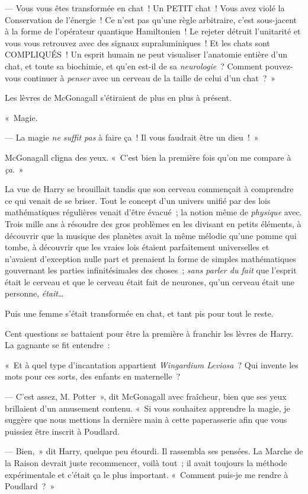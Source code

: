 --- Vous vous êtes transformée en chat~! Un PETIT chat~! Vous avez violé la Conservation de l'énergie~! Ce n'est pas qu'une règle arbitraire, c'est sous-jacent à la forme de l'opérateur quantique Hamiltonien~! Le rejeter détruit l'unitarité et vous vous retrouvez avec des signaux supraluminiques~! Et les chats sont COMPLIQUÉS~! Un esprit humain ne peut visualiser l'anatomie entière d'un chat, et toute sa biochimie, et qu'en est-il de sa \emph{neurologie}~? Comment pouvez-vous continuer à \emph{penser} avec un cerveau de la taille de celui d'un chat~?~»

Les lèvres de McGonagall s'étiraient de plus en plus à présent.

«~Magie.

--- La magie \emph{ne suffit pas} à faire ça~! Il vous faudrait être un dieu~!~»

McGonagall cligna des yeux. «~C'est bien la première fois qu'on me compare à \emph{ça}.~»

La vue de Harry se brouillait tandis que son cerveau commençait à comprendre ce qui venait de se briser. Tout le concept d'un univers unifié par des lois mathématiques régulières venait d'être évacué~; la notion même de \emph{physique} avec. Trois mille ans à résoudre des gros problèmes en les divisant en petits éléments, à découvrir que la musique des planètes avait la même mélodie qu'une pomme qui tombe, à découvrir que les vraies lois étaient parfaitement universelles et n'avaient d'exception nulle part et prenaient la forme de simples mathématiques gouvernant les parties infinitésimales des choses~; \emph{sans parler du fait} que l'esprit était le cerveau et que le cerveau était fait de neurones, qu'un cerveau était une personne, \emph{était}…

Puis une femme s'était transformée en chat, et tant pis pour tout le reste.

Cent questions se battaient pour être la première à franchir les lèvres de Harry. La gagnante se fit entendre~:

«~Et à quel type d'incantation appartient \emph{Wingardium Leviosa}~? Qui invente les mots pour ces sorts, des enfants en maternelle~?

--- C'est assez, M. Potter~», dit McGonagall avec fraîcheur, bien que ses yeux brillaient d'un amusement contenu. «~Si vous souhaitez apprendre la magie, je suggère que nous mettions la dernière main à cette paperasserie afin que vous puissiez être inscrit à Poudlard.

--- Bien,~» dit Harry, quelque peu étourdi. Il rassembla ses pensées. La Marche de la Raison devrait juste recommencer, voilà tout~; il avait toujours la méthode expérimentale et c'était ça le plus important. «~Comment puis-je me rendre à Poudlard~?~»

